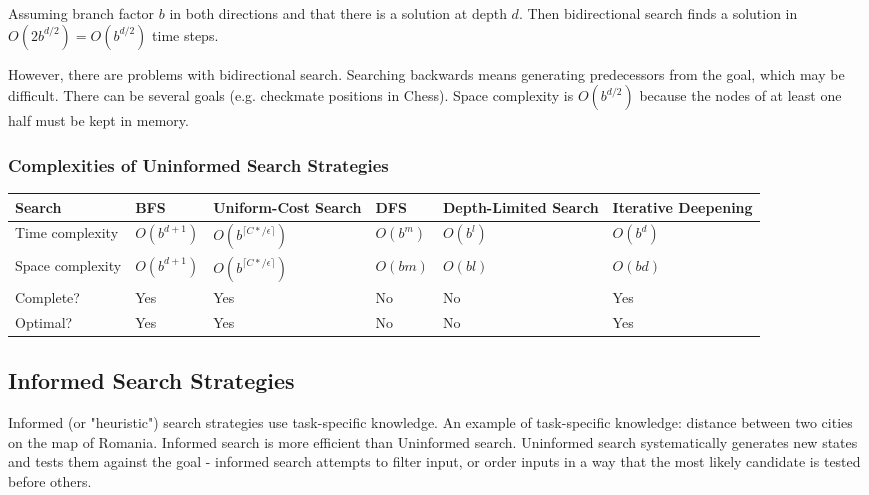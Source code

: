 Assuming branch factor $b$ in both directions and that there is a solution at
depth $d$. Then bidirectional search finds a solution in $O(2b^{d/2}) =
O(b^{d/2})$ time steps.

However, there are problems with bidirectional search. Searching backwards
means generating predecessors from the goal, which may be difficult. There can
be several goals (e.g. checkmate positions in Chess). Space complexity is
$O(b^{d/2})$ because the nodes of at least one half must be kept in memory.

\subsubsection{Complexities of Uninformed Search Strategies}

\begin{tabular}{| l | p{1.3cm} | p{2.8cm} | p{1cm} | p{2.8cm} | p{2cm} |}
\hline
Search & BFS & Uniform-Cost Search & DFS & Depth-Limited Search & Iterative Deepening\\ \hline
Time complexity & $O(b^{d+1})$ & $O(b^{\lceil C*/\epsilon\rceil})$ & $O(b^m)$ & $O(b^l)$ &
$O(b^d)$\\ \hline
Space complexity & $O(b^{d+1})$ & $O(b^{\lceil C*/\epsilon\rceil})$ & $O(bm)$ &
$O(bl)$ & $O(bd)$\\ \hline
Complete? & Yes\footnotemark & Yes\footnotemark & No & No &
Yes\footnotemark[1]\\ \hline
Optimal? & Yes\footnotemark
& Yes & No & No & Yes\footnotemark[3]\\
\hline
\end{tabular}

\subsection{Informed Search Strategies}
Informed (or "heuristic") search strategies use task-specific knowledge.
An example of task-specific knowledge: distance between two cities on the map
of Romania.
Informed search is more efficient than Uninformed search.
Uninformed search systematically generates new states and tests them against
the goal - informed search attempts to filter input, or order inputs in a way
that the most likely candidate is tested before others.
